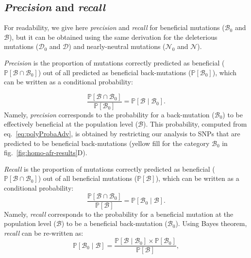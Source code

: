 \documentclass[9pt,twocolumn,twoside,lineno]{pnas-new}
\newcommand{\proba}{\mathbb{P}}
\newcommand{\SphyDel}{\mathcal{D}_0}
\newcommand{\SphyNeu}{\mathcal{N}_0}
\newcommand{\SphyBen}{\mathcal{B}_0}
\newcommand{\given}{\mid}
\newcommand{\SpopDel}{\mathcal{D}}
\newcommand{\SpopNeu}{\mathcal{N}}
\newcommand{\SpopBen}{\mathcal{B}}
\newcommand{\ProbaPopBen}{\proba [ \SpopBen ]}
\begin{document}
{       \subsection{\textit{Precision} and \textit{recall}}
       \label{subsec:precisison_recall}
       For readability, we give here \textit{precision} and \textit{recall} for beneficial mutations ($\SphyBen$ and $\SpopBen$), but it can be obtained using the same derivation for the deleterious mutations ($\SphyDel$ and $\SpopDel$) and nearly-neutral mutations ($\SphyNeu$ and $\SpopNeu$).

       \textit{Precision} is the proportion of mutations correctly predicted as beneficial ($\proba [ \SpopBen \cap  \SphyBen]$) out of all predicted as beneficial back-mutations ($\proba [ \SphyBen]$), which can be written as a conditional probability:

       \begin{equation}
              \frac{\proba [ \SpopBen  \cap  \SphyBen]}{\proba [ \SphyBen]} = \proba [ \SpopBen  \given  \SphyBen].
              \label{eq:precision}
       \end{equation}
       Namely, \textit{precision} corresponds to the probability for a back-mutation ($\SphyBen$) to be effectively beneficial at the population level ($\SpopBen$).
       This probability, computed from eq.~\ref{eq:polyProbaAdv}, is obtained by restricting our analysis to SNPs that are predicted to be beneficial back-mutations (yellow fill for the category $\SphyBen$ in fig.~\ref{fig:homo-afr-results}D).

       \textit{Recall} is the proportion of mutations correctly predicted as beneficial ($\proba [ \SpopBen \cap  \SphyBen]$) out of all beneficial mutations ($\proba [ \SpopBen]$), which can be written as a conditional probability:
       \begin{equation}
              \frac{\proba [ \SpopBen \cap  \SphyBen]}{\proba [ \SpopBen]} = \proba [ \SphyBen  \given \SpopBen ].
       \end{equation}
       Namely, \textit{recall} corresponds to the probability for a beneficial mutation at the population level ($\SpopBen$) to be a beneficial back-mutation ($\SphyBen$).
       Using Bayes theorem, \textit{recall} can be re-written as:
       \begin{equation}
              \proba [\SphyBen \given \SpopBen] = \frac{\proba [\SpopBen \given \SphyBen] \times \proba[\SphyBen]}{\ProbaPopBen},
              \label{eq:bayes}
       \end{equation}

}
\end{document}
